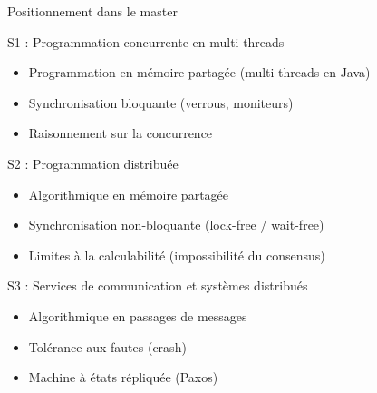 
\begingroup

\begin{frame}{Positionnement dans le master}

  \begin{block}{S1 : Programmation concurrente en multi-threads}
    \begin{itemize}
    \item Programmation en mémoire partagée (multi-threads en Java)
    \item Synchronisation bloquante (verrous, moniteurs)
    \item Raisonnement sur la concurrence
    \end{itemize}
  \end{block}

  \begin{block}{S2 : Programmation distribuée}
    \begin{itemize}
    \item Algorithmique en mémoire partagée
    \item Synchronisation non-bloquante (lock-free / wait-free)
    \item Limites à la calculabilité (impossibilité du consensus)
    \end{itemize}
  \end{block}

  \begin{alertblock}{S3 : Services de communication et systèmes distribués}
    \begin{itemize}
    \item Algorithmique en passages de messages
    \item Tolérance aux fautes (crash)
    \item Machine à états répliquée (Paxos)
    \end{itemize}
  \end{alertblock}

\end{frame}

\endgroup
\endinput
